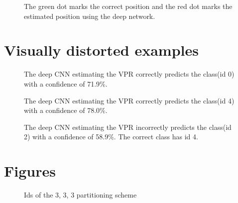 \begin{figure}[H]
	\begin{center}
	\begin{scriptsize}
		\sffamily
		\def\svgwidth{0.9\textwidth}
		
	\end{scriptsize}
	\label{fig:aecollection}
	\caption[AR error examples visualised]{The green dot marks the correct position and the red dot marks the estimated position using the deep network.}
	\end{center}
\end{figure}

\section{Visually distorted examples}
\label{sec:vdexamples}
\begin{figure}[H]
	\begin{center}
	\begin{scriptsize}
		\sffamily
		
	\end{scriptsize}
	\label{fig:vd1}
	\caption[Visually distorted example]{The deep CNN estimating the VPR correctly predicts the class(id 0) with a confidence of 71.9\%.}
	\end{center}
\end{figure}

\begin{figure}[H]
	\begin{center}
	\begin{scriptsize}
		\sffamily
		
	\end{scriptsize}
	\label{fig:vd2}
	\caption[Visually distorted example]{The deep CNN estimating the VPR correctly predicts the class(id 4) with a confidence of 78.0\%.}
	\end{center}
\end{figure}

\begin{figure}[H]
	\begin{center}
	\begin{scriptsize}
		\sffamily
		
	\end{scriptsize}
	\label{fig:vd3}
	\caption[Visually distorted example]{The deep CNN estimating the VPR incorrectly predicts the class(id 2) with a confidence of 58.9\%. The correct class has id 4.}
	\end{center}
\end{figure}

\section{Figures}

\begin{figure}[H]
	\begin{scriptsize}
		\sffamily
		\def\svgwidth{\textwidth}
		
	\end{scriptsize}
	\caption{Ids of the 3, 3, 3 partitioning scheme}
	\label{fig:ids}
\end{figure}






